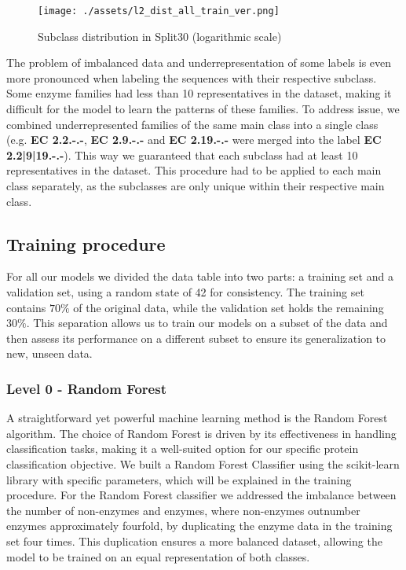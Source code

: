 \documentclass{bioinfo}
\begin{document}
\begin{methods}
\begin{figure}[!htpb]
\texttt{[image: ./assets/l2\_dist\_all\_train\_ver.png]}
\caption{Subclass distribution in Split30 (logarithmic scale)}\label{fig:l2_dist_train}
\end{figure}

The problem of imbalanced data and underrepresentation of some labels is even more pronounced when labeling the sequences with their respective subclass.
Some enzyme families had less than 10 representatives in the dataset, making it difficult for the model to learn the patterns of these families.
To address issue, we combined underrepresented families of the same main class into a single class 
(e.g. \textbf{EC 2.2.-.-}, \textbf{EC 2.9.-.-} and \textbf{EC 2.19.-.-} were merged into the label \textbf{EC 2.2|9|19.-.-}).
This way we guaranteed that each subclass had at least 10 representatives in the dataset.
This procedure had to be applied to each main class separately, as the subclasses are only unique within their respective main class.

\subsection{Training procedure}
For all our models we divided the data table into two parts: a training set and a validation set, using a random state of 42 for consistency. 
The training set contains $70\%$ of the original data, while the validation set holds the remaining $30\%$. 
This separation allows us to train our models on a subset of the data and then assess its performance on a different subset to ensure its generalization to new, unseen data.

\subsubsection{Level 0 - Random Forest}
A straightforward yet powerful machine learning method is the Random Forest algorithm.
The choice of Random Forest is driven by its effectiveness in handling classification tasks, making it a well-suited option for our specific protein classification objective.
We built a Random Forest Classifier using the scikit-learn library with specific parameters, which will be explained in the training procedure. 
For the Random Forest classifier we addressed the imbalance between the number of non-enzymes and enzymes, where non-enzymes outnumber enzymes approximately fourfold,
by duplicating the enzyme data in the training set four times.
This duplication ensures a more balanced dataset, allowing the model to be trained on an equal representation of both classes.


\end{methods}
\end{document}
